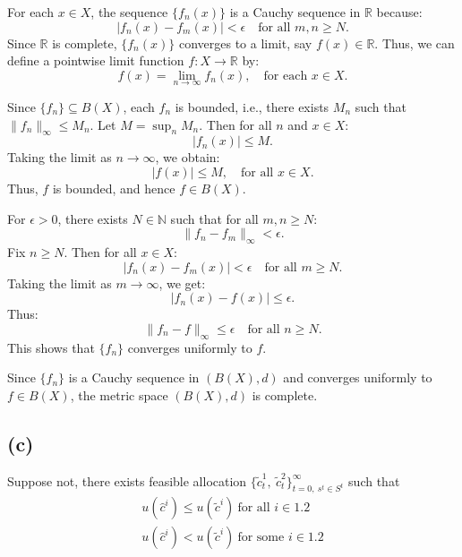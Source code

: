\documentclass{ltjsarticle}
\begin{document}
For each $x \in X$, the sequence $\{f_n(x)\}$ is a Cauchy sequence in $\mathbb{R}$ because:
\[
|f_n(x) - f_m(x)| < \epsilon \quad \text{for all } m, n \geq N.
\]
Since $\mathbb{R}$ is complete, $\{f_n(x)\}$ converges to a limit, say $f(x) \in \mathbb{R}$. Thus, we can define a pointwise limit function $f: X \to \mathbb{R}$ by:
\[
f(x) = \lim_{n \to \infty} f_n(x), \quad \text{for each } x \in X.
\]

Since $\{f_n\} \subseteq B(X)$, each $f_n$ is bounded, i.e., there exists $M_n$ such that $\|f_n\|_{\infty} \leq M_n$. Let $M = \sup_n M_n$. Then for all $n$ and $x \in X$:
\[
|f_n(x)| \leq M.
\]
Taking the limit as $n \to \infty$, we obtain:
\[
|f(x)| \leq M, \quad \text{for all } x \in X.
\]
Thus, $f$ is bounded, and hence $f \in B(X)$.

For $\epsilon > 0$, there exists $N \in \mathbb{N}$ such that for all $m, n \geq N$:
\[
\|f_n - f_m\|_{\infty} < \epsilon.
\]
Fix $n \geq N$. Then for all $x \in X$:
\[
|f_n(x) - f_m(x)| < \epsilon \quad \text{for all } m \geq N.
\]
Taking the limit as $m \to \infty$, we get:
\[
|f_n(x) - f(x)| \leq \epsilon.
\]
Thus:
\[
\|f_n - f\|_{\infty} \leq \epsilon \quad \text{for all } n \geq N.
\]
This shows that $\{f_n\}$ converges uniformly to $f$.

Since $\{f_n\}$ is a Cauchy sequence in $(B(X), d)$ and converges uniformly to $f \in B(X)$, the metric space $(B(X), d)$ is complete.


\subsection*{(c)}

Suppose not, there exists feasible allocation $\{\tilde{c}_t^1,\ \tilde{c}_t^2\}^{\infty}_{t=0,\ s^t\in S^t}$ such that
\begin{align*}
    u(\hat{c}^i) \leq u(\tilde{c}^i) \ \text{for all } i\in \qty{1,2}\\
    u(\hat{c}^i) < u(\tilde{c}^i) \ \text{for some } i\in \qty{1,2}
\end{align*}
\end{document}
